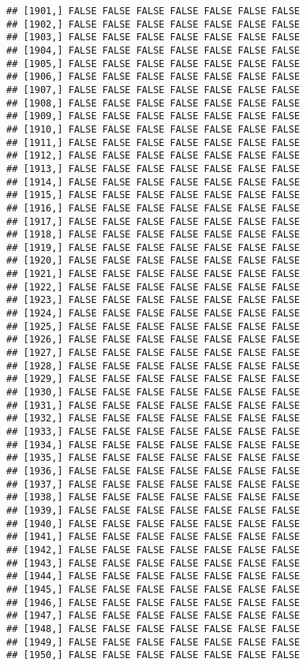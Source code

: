 \documentclass[
]{article}
\begin{document}
\begin{verbatim}
## [1901,] FALSE FALSE FALSE FALSE FALSE FALSE FALSE
## [1902,] FALSE FALSE FALSE FALSE FALSE FALSE FALSE
## [1903,] FALSE FALSE FALSE FALSE FALSE FALSE FALSE
## [1904,] FALSE FALSE FALSE FALSE FALSE FALSE FALSE
## [1905,] FALSE FALSE FALSE FALSE FALSE FALSE FALSE
## [1906,] FALSE FALSE FALSE FALSE FALSE FALSE FALSE
## [1907,] FALSE FALSE FALSE FALSE FALSE FALSE FALSE
## [1908,] FALSE FALSE FALSE FALSE FALSE FALSE FALSE
## [1909,] FALSE FALSE FALSE FALSE FALSE FALSE FALSE
## [1910,] FALSE FALSE FALSE FALSE FALSE FALSE FALSE
## [1911,] FALSE FALSE FALSE FALSE FALSE FALSE FALSE
## [1912,] FALSE FALSE FALSE FALSE FALSE FALSE FALSE
## [1913,] FALSE FALSE FALSE FALSE FALSE FALSE FALSE
## [1914,] FALSE FALSE FALSE FALSE FALSE FALSE FALSE
## [1915,] FALSE FALSE FALSE FALSE FALSE FALSE FALSE
## [1916,] FALSE FALSE FALSE FALSE FALSE FALSE FALSE
## [1917,] FALSE FALSE FALSE FALSE FALSE FALSE FALSE
## [1918,] FALSE FALSE FALSE FALSE FALSE FALSE FALSE
## [1919,] FALSE FALSE FALSE FALSE FALSE FALSE FALSE
## [1920,] FALSE FALSE FALSE FALSE FALSE FALSE FALSE
## [1921,] FALSE FALSE FALSE FALSE FALSE FALSE FALSE
## [1922,] FALSE FALSE FALSE FALSE FALSE FALSE FALSE
## [1923,] FALSE FALSE FALSE FALSE FALSE FALSE FALSE
## [1924,] FALSE FALSE FALSE FALSE FALSE FALSE FALSE
## [1925,] FALSE FALSE FALSE FALSE FALSE FALSE FALSE
## [1926,] FALSE FALSE FALSE FALSE FALSE FALSE FALSE
## [1927,] FALSE FALSE FALSE FALSE FALSE FALSE FALSE
## [1928,] FALSE FALSE FALSE FALSE FALSE FALSE FALSE
## [1929,] FALSE FALSE FALSE FALSE FALSE FALSE FALSE
## [1930,] FALSE FALSE FALSE FALSE FALSE FALSE FALSE
## [1931,] FALSE FALSE FALSE FALSE FALSE FALSE FALSE
## [1932,] FALSE FALSE FALSE FALSE FALSE FALSE FALSE
## [1933,] FALSE FALSE FALSE FALSE FALSE FALSE FALSE
## [1934,] FALSE FALSE FALSE FALSE FALSE FALSE FALSE
## [1935,] FALSE FALSE FALSE FALSE FALSE FALSE FALSE
## [1936,] FALSE FALSE FALSE FALSE FALSE FALSE FALSE
## [1937,] FALSE FALSE FALSE FALSE FALSE FALSE FALSE
## [1938,] FALSE FALSE FALSE FALSE FALSE FALSE FALSE
## [1939,] FALSE FALSE FALSE FALSE FALSE FALSE FALSE
## [1940,] FALSE FALSE FALSE FALSE FALSE FALSE FALSE
## [1941,] FALSE FALSE FALSE FALSE FALSE FALSE FALSE
## [1942,] FALSE FALSE FALSE FALSE FALSE FALSE FALSE
## [1943,] FALSE FALSE FALSE FALSE FALSE FALSE FALSE
## [1944,] FALSE FALSE FALSE FALSE FALSE FALSE FALSE
## [1945,] FALSE FALSE FALSE FALSE FALSE FALSE FALSE
## [1946,] FALSE FALSE FALSE FALSE FALSE FALSE FALSE
## [1947,] FALSE FALSE FALSE FALSE FALSE FALSE FALSE
## [1948,] FALSE FALSE FALSE FALSE FALSE FALSE FALSE
## [1949,] FALSE FALSE FALSE FALSE FALSE FALSE FALSE
## [1950,] FALSE FALSE FALSE FALSE FALSE FALSE FALSE

\end{verbatim}
\end{document}
